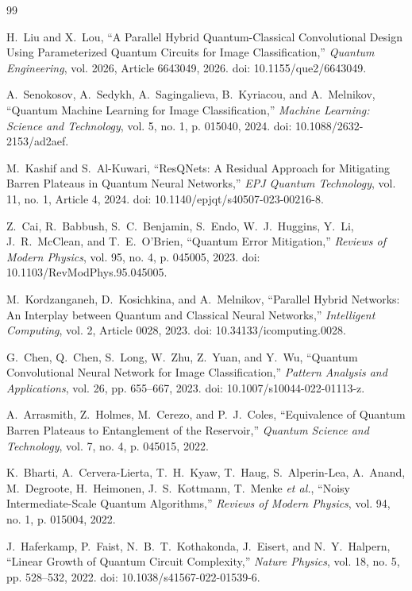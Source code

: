 \documentclass[pdflatex,sn-mathphys-num]{sn-jnl}%
\theoremstyle{thmstyleone}%
\theoremstyle{thmstyletwo}%
\theoremstyle{thmstylethree}%
\begin{document}
\begin{thebibliography}{99}

H.~Liu and X.~Lou,
``A Parallel Hybrid Quantum-Classical Convolutional Design Using Parameterized Quantum Circuits for Image Classification,''
\emph{Quantum Engineering}, vol. 2026, Article 6643049, 2026.
doi: 10.1155/que2/6643049.

A.~Senokosov, A.~Sedykh, A.~Sagingalieva, B.~Kyriacou, and A.~Melnikov,
``Quantum Machine Learning for Image Classification,''
\emph{Machine Learning: Science and Technology}, vol. 5, no. 1,
p. 015040, 2024.
doi: 10.1088/2632-2153/ad2aef.

M.~Kashif and S.~Al-Kuwari,
``ResQNets: A Residual Approach for Mitigating Barren Plateaus in Quantum Neural Networks,''
\emph{EPJ Quantum Technology}, vol. 11, no. 1, Article 4, 2024.
doi: 10.1140/epjqt/s40507-023-00216-8.

Z.~Cai, R.~Babbush, S.~C.~Benjamin, S.~Endo, W.~J.~Huggins,
Y.~Li, J.~R.~McClean, and T.~E.~O'Brien,
``Quantum Error Mitigation,''
\emph{Reviews of Modern Physics}, vol. 95, no. 4, p. 045005, 2023.
doi: 10.1103/RevModPhys.95.045005.

M.~Kordzanganeh, D.~Kosichkina, and A.~Melnikov,
``Parallel Hybrid Networks: An Interplay between Quantum and Classical Neural Networks,''
\emph{Intelligent Computing}, vol. 2, Article 0028, 2023.
doi: 10.34133/icomputing.0028.

G.~Chen, Q.~Chen, S.~Long, W.~Zhu, Z.~Yuan, and Y.~Wu,
``Quantum Convolutional Neural Network for Image Classification,''
\emph{Pattern Analysis and Applications}, vol. 26,
pp. 655--667, 2023.
doi: 10.1007/s10044-022-01113-z.

A.~Arrasmith, Z.~Holmes, M.~Cerezo, and P.~J.~Coles,
``Equivalence of Quantum Barren Plateaus to Entanglement of the Reservoir,''
\emph{Quantum Science and Technology}, vol. 7, no. 4,
p. 045015, 2022.

K.~Bharti, A.~Cervera-Lierta, T.~H.~Kyaw, T.~Haug, S.~Alperin-Lea,
A.~Anand, M.~Degroote, H.~Heimonen, J.~S.~Kottmann, T.~Menke
\emph{et al.},
``Noisy Intermediate-Scale Quantum Algorithms,''
\emph{Reviews of Modern Physics}, vol. 94, no. 1, p. 015004, 2022.

J.~Haferkamp, P.~Faist, N.~B.~T.~Kothakonda, J.~Eisert, and
N.~Y.~Halpern,
``Linear Growth of Quantum Circuit Complexity,''
\emph{Nature Physics}, vol. 18, no. 5,
pp. 528--532, 2022.
doi: 10.1038/s41567-022-01539-6.


\end{thebibliography}
\end{document}
